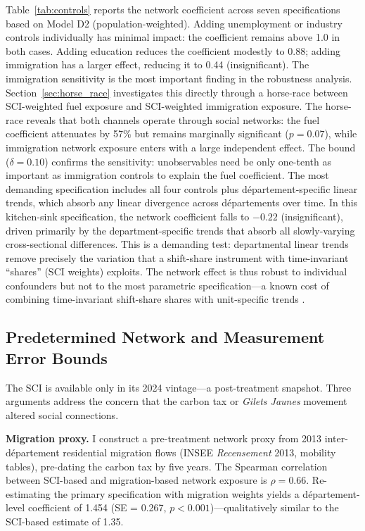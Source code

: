 \documentclass[12pt]{article}
\newcommand{\gj}{\textit{Gilets Jaunes}}
\newcommand{\dept}{d\'{e}partement}
\newcommand{\depts}{d\'{e}partements}
\begin{document}
Table~\ref{tab:controls} reports the network coefficient across seven specifications based on Model D2 (population-weighted). Adding unemployment or industry controls individually has minimal impact: the coefficient remains above 1.0 in both cases. Adding education reduces the coefficient modestly to 0.88; adding immigration has a larger effect, reducing it to 0.44 (insignificant). The immigration sensitivity is the most important finding in the robustness analysis. Section~\ref{sec:horse_race} investigates this directly through a horse-race between SCI-weighted fuel exposure and SCI-weighted immigration exposure. The horse-race reveals that both channels operate through social networks: the fuel coefficient attenuates by 57\% but remains marginally significant ($p = 0.07$), while immigration network exposure enters with a large independent effect. The \citet{oster2019unobservable} bound ($\delta = 0.10$) confirms the sensitivity: unobservables need be only one-tenth as important as immigration controls to explain the fuel coefficient. The most demanding specification includes all four controls plus \dept{}-specific linear trends, which absorb any linear divergence across \depts{} over time. In this kitchen-sink specification, the network coefficient falls to $-0.22$ (insignificant), driven primarily by the department-specific trends that absorb all slowly-varying cross-sectional differences. This is a demanding test: departmental linear trends remove precisely the variation that a shift-share instrument with time-invariant ``shares'' (SCI weights) exploits. The network effect is thus robust to individual confounders but not to the most parametric specification---a known cost of combining time-invariant shift-share shares with unit-specific trends \citep{adao2019shift}.

\subsection{Predetermined Network and Measurement Error Bounds}
\label{sec:predetermined}

The SCI is available only in its 2024 vintage---a post-treatment snapshot. Three arguments address the concern that the carbon tax or \gj{} movement altered social connections.

\textbf{Migration proxy.} I construct a pre-treatment network proxy from 2013 inter-\dept{} residential migration flows (INSEE \textit{Recensement} 2013, mobility tables), pre-dating the carbon tax by five years. The Spearman correlation between SCI-based and migration-based network exposure is $\rho = 0.66$. Re-estimating the primary specification with migration weights yields a \dept{}-level coefficient of 1.454 (SE = 0.267, $p < 0.001$)---qualitatively similar to the SCI-based estimate of 1.35.
\end{document}
